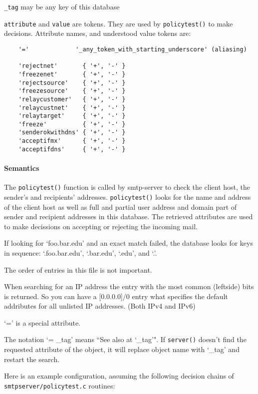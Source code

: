 {\tt \_tag} may be any key of this database

{\tt attribute} and {\tt value} are tokens. They are used by 
{\tt policytest()} to make decisions.  Attribute names, and understood 
value tokens are:

\begin{verbatim}
    '='             '_any_token_with_starting_underscore' (aliasing)

    'rejectnet'       { '+', '-' }
    'freezenet'       { '+', '-' }
    'rejectsource'    { '+', '-' }
    'freezesource'    { '+', '-' }
    'relaycustomer'   { '+', '-' }
    'relaycustnet'    { '+', '-' }
    'relaytarget'     { '+', '-' }
    'freeze'          { '+', '-' }
    'senderokwithdns' { '+', '-' }
    'acceptifmx'      { '+', '-' }
    'acceptifdns'     { '+', '-' }
\end{verbatim}


\paragraph{Semantics}



The {\tt policytest()} function is called by smtp-server to check the client 
host, the sender's and recipients' addresses.  {\tt policytest()} looks for 
the name and address of the client host as well as full and partial user address 
and domain part of sender and recipient addresses in this database.  The 
retrieved attributes are used to make decissions on accepting or rejecting 
the incoming mail.

If looking for `foo.bar.edu' and an exact match failed, the database looks for 
keys in sequence:  `.foo.bar.edu', `.bar.edu', `.edu', and `.'.

The order of entries in this file is not important.

When searching for an IP address the entry with the most common (leftside) bits
is returned. So you can have a [0.0.0.0]/0 entry what specifies the 
default addributes for all unlisted IP addresses. (Both IPv4 and IPv6)

`=' is a special attribute.

The notation `= \_tag' means ``See also at `\_tag'". If {\tt server()} doesn't 
find the requested attribute of the object, it will replace object name 
with `\_tag' and restart the search.

Here is an example configuration, assuming the following decision 
chains of {\tt smtpserver/policytest.c} routines:

